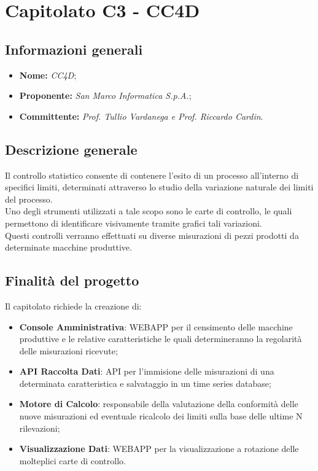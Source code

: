 \section{Capitolato C3 - CC4D}\label{section:c3}

\subsection{Informazioni generali}
	\begin {itemize}
		\item \textbf{Nome:} \textit{CC4D};
		\item \textbf{Proponente:} \textit{San Marco Informatica S.p.A.};
		\item \textbf{Committente:} \textit{Prof. Tullio Vardanega e Prof. Riccardo Cardin}.
	\end{itemize}

\subsection{Descrizione generale}
	Il controllo statistico consente di contenere l'esito di un processo all'interno di specifici limiti, determinati attraverso lo studio della variazione naturale dei limiti del processo.\\
	Uno degli strumenti utilizzati a tale scopo sono le carte di controllo, le quali permettono di identificare visivamente tramite grafici tali variazioni.\\
	Questi controlli verranno effettuati su diverse misurazioni di pezzi prodotti da determinate macchine produttive.

\subsection{Finalità del progetto}
	Il capitolato richiede la creazione di:
	\begin{itemize}
		\item \textbf{Console Amministrativa}: WEBAPP per il censimento delle macchine produttive e le relative caratteristiche le quali determineranno la regolarità delle misurazioni ricevute;
		\item \textbf{API Raccolta Dati}: API per l'immisione delle misurazioni di una determinata caratteristica e salvataggio in un time series database\glo;
		\item \textbf{Motore di Calcolo}: responsabile della valutazione della conformità delle nuove misurazioni ed eventuale ricalcolo dei limiti sulla base delle ultime N rilevazioni;
		\item \textbf{Visualizzazione Dati}: WEBAPP per la visualizzazione a rotazione delle molteplici carte di controllo.
	\end{itemize}


